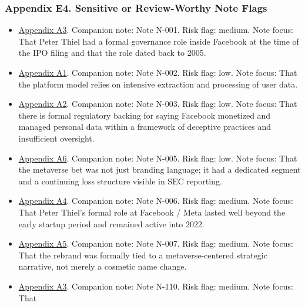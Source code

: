 \documentclass[
  american,
  11pt,
  letterpaper,
]{article}
\providecommand{\tightlist}{%
  \setlength{\itemsep}{0pt}\setlength{\parskip}{0pt}}
\begin{document}
\subsubsection{Appendix E4. Sensitive or Review-Worthy Note
Flags}\label{appendix-e4-sensitive-or-review-worthy-note-flags}

\begin{itemize}
\tightlist
\item
  \hyperref[appendix-a3-facebook-inc-registration-statement-on-form-s-1]{Appendix
  A3}. Companion note: Note N-001. Risk flag: medium. Note focus: That
  Peter Thiel had a formal governance role inside Facebook at the time
  of the IPO filing and that the role dated back to 2005.
\item
  \hyperref[appendix-a1-a-look-behind-the-screens-examining-the-data-practices-of-social-media-and-video-streaming-services]{Appendix
  A1}. Companion note: Note N-002. Risk flag: low. Note focus: That the
  platform model relies on intensive extraction and processing of user
  data.
\item
  \hyperref[appendix-a2-ftc-imposes-5-billion-penalty-and-sweeping-new-privacy-restrictions-on-facebook]{Appendix
  A2}. Companion note: Note N-003. Risk flag: low. Note focus: That
  there is formal regulatory backing for saying Facebook monetized and
  managed personal data within a framework of deceptive practices and
  insufficient oversight.
\item
  \hyperref[appendix-a6-meta-platforms-inc-2023-annual-report-form-10-k]{Appendix
  A6}. Companion note: Note N-005. Risk flag: low. Note focus: That the
  metaverse bet was not just branding language; it had a dedicated
  segment and a continuing loss structure visible in SEC reporting.
\item
  \hyperref[appendix-a4-meta-platforms-inc-2022-definitive-proxy-statement]{Appendix
  A4}. Companion note: Note N-006. Risk flag: medium. Note focus: That
  Peter Thiel's formal role at Facebook / Meta lasted well beyond the
  early startup period and remained active into 2022.
\item
  \hyperref[appendix-a5-the-facebook-company-is-now-meta]{Appendix A5}.
  Companion note: Note N-007. Risk flag: medium. Note focus: That the
  rebrand was formally tied to a metaverse-centered strategic narrative,
  not merely a cosmetic name change.
\item
  \hyperref[appendix-a3-facebook-inc-registration-statement-on-form-s-1]{Appendix
  A3}. Companion note: Note N-110. Risk flag: medium. Note focus: That

\end{itemize}
\end{document}
